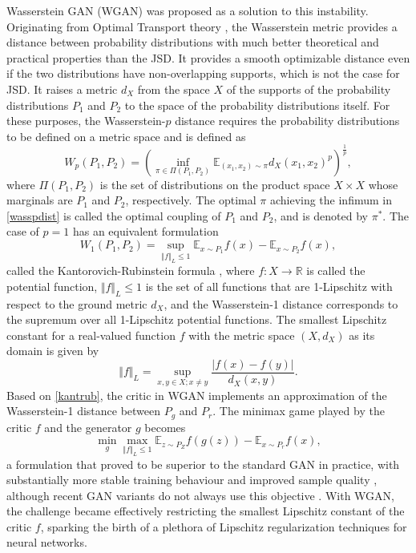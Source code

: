 \documentclass{article}
\begin{document}
Wasserstein GAN (WGAN) \citep{Arjovskyetal2017} was proposed as a solution to this instability. Originating from Optimal Transport theory \citep{Villani2008}, the Wasserstein metric provides a distance between probability distributions with much better theoretical and practical properties than the JSD. It provides a smooth optimizable distance even if the two distributions have non-overlapping supports, which is not the case for JSD. It raises a metric $d_X$ from the space $X$ of the supports of the probability distributions $P_1$ and $P_2$ to the space of the probability distributions itself. For these purposes, the Wasserstein-$p$ distance requires the probability distributions to be defined on a metric space and is defined as
\begin{equation} \label{wasspdist}
W_p(P_1,P_2)=\left(\inf_{\pi\in\Pi(P_1,P_2)}\mathbb{E}_{(x_1,x_2)\sim\pi}d_X(x_1,x_2)^p\right)^{\frac{1}{p}},
\end{equation}
where $\Pi(P_1,P_2)$ is the set of distributions on the product space $X \times X$ whose marginals are $P_1$ and $P_2$, respectively. The optimal $\pi$ achieving the infimum in \eqref{wasspdist} is called the optimal coupling of $P_1$ and $P_2$, and is denoted by $\pi^\ast$. The case of $p=1$ has an equivalent formulation
\begin{equation} \label{kantrub}
W_1(P_1,P_2)=\sup_{\Vert{f}\Vert_L\leq1}\mathbb{E}_{x\sim P_1}f(x)-\mathbb{E}_{x\sim P_2}f(x),
\end{equation}
called the Kantorovich-Rubinstein formula \citep{Villani2008}, where $f : X \to\mathbb{R}$ is called the potential function, $\Vert{f}\Vert_L\leq1$ is the set of all functions that are 1-Lipschitz with respect to the ground metric $d_X$, and the Wasserstein-1 distance corresponds to the supremum over all 1-Lipschitz potential functions. The smallest Lipschitz constant for a real-valued function $f$ with the metric space $(X,d_X)$ as its domain is given by
\begin{equation} \label{lip_norm}
\Vert{f}\Vert_L=\sup_{x,y\in X;x\neq y}{\frac{\lvert f(x)-f(y)\rvert}{d_X(x,y)}}.
\end{equation}
Based on \eqref{kantrub}, the critic in WGAN \citep{Arjovskyetal2017} implements an approximation of the Wasserstein-1 distance between $P_g$ and $P_r$. The minimax game played by the critic $f$ and the generator $g$ becomes
\begin{equation}
\min_g \max_{\Vert{f}\Vert_L\leq1} \mathbb{E}_{z \sim P_{Z}}f(g(z))-\mathbb{E}_{x \sim P_{r}}f(x),
\end{equation}
a formulation that proved to be superior to the standard GAN in practice, with substantially more stable training behaviour and improved sample quality \citep{Arjovskyetal2017}, although recent GAN variants do not always use this objective \citep{Brocketal2018}. With WGAN, the challenge became effectively restricting the smallest Lipschitz constant of the critic $f$, sparking the birth of a plethora of Lipschitz regularization techniques for neural networks.
\end{document}

